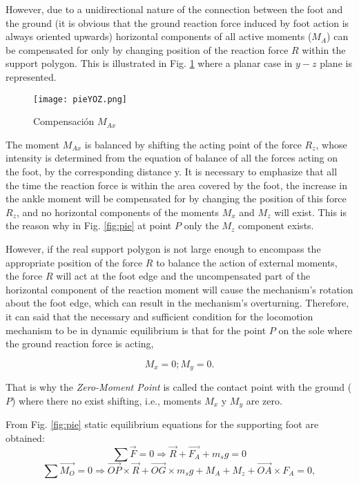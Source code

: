 However, due to a unidirectional nature of the connection between the foot and the ground (it is obvious that the ground reaction force induced by foot action is always oriented upwards) horizontal components of all active moments ($M_A$) can be compensated for only by changing position of the reaction force $R$ within the support polygon. This is illustrated in Fig. \ref{fig:pieYOZ} where a planar case in $y-z$ plane is represented.

\begin{figure}[!hbt]
\centering
\texttt{[image: pieYOZ.png]}
\caption{Compensación $M_{Ax}$ \cite{Vuk_2004}}
\label{fig:pieYOZ}
\end{figure} 

The moment $M_{Ax}$ is balanced by shifting the acting point of the force $R_z$, whose intensity is determined from the equation of balance of all the forces acting on the foot, by the corresponding distance y. It is necessary to emphasize that all the time the reaction force is within the area covered by the foot, the increase in the ankle moment will be compensated for by changing the position of this force $R_z$, and no horizontal components of the moments $M_x$ and $M_z$ will exist. This is the reason why in Fig. \ref{fig:pie} at point $P$ only the $M_z$ component exists.

However, if the real support polygon is not large enough to encompass the appropriate position of the force $R$ to balance the action of external moments, the force $R$ will act at the foot edge and the uncompensated part of the horizontal component of the reaction moment will cause the mechanism’s rotation about the foot edge, which can result in the mechanism’s overturning. Therefore, it can said that the necessary and sufficient condition for the locomotion mechanism to be in dynamic equilibrium is that for the point $P$ on the sole where the ground reaction force is acting,

\begin{equation}
M_x = 0;
M_y = 0.
\end{equation}

That is why the \textit{Zero-Moment Point} is called the contact point with the ground ($P$) where there no exist shifting, i.e., moments $M_x$ y $M_y$ are zero.

From Fig. \ref{fig:pie} static equilibrium equations for the supporting foot are obtained:
\begin{equation}
\sum \overrightarrow{F} = 0 \Rightarrow \overrightarrow{R} + \overrightarrow{F_A} + m_s g = 0
\label{eq:fuerzas}
\end{equation}
\begin{equation}
\sum \overrightarrow{M_O} = 0 \Rightarrow \overrightarrow{OP} \times \overrightarrow{R} + \overrightarrow{OG} \times m_sg + M_A + M_z + \overrightarrow{OA} \times F_A = 0,
\label{eq:momentos}
\end{equation}

